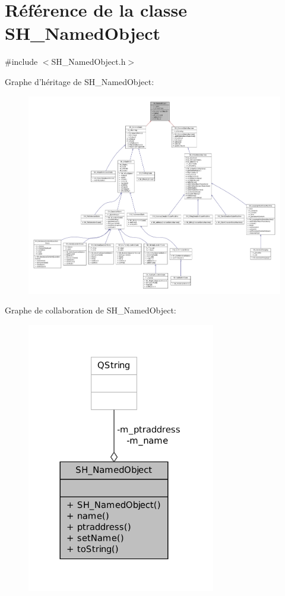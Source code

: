 \hypertarget{classSH__NamedObject}{\section{Référence de la classe S\-H\-\_\-\-Named\-Object}
\label{classSH__NamedObject}
}


{\ttfamily \#include $<$S\-H\-\_\-\-Named\-Object.\-h$>$}



Graphe d'héritage de S\-H\-\_\-\-Named\-Object\-:
\nopagebreak
\begin{figure}[H]
\begin{center}
\leavevmode
\includegraphics[width=350pt]{classSH__NamedObject__inherit__graph}
\end{center}
\end{figure}


Graphe de collaboration de S\-H\-\_\-\-Named\-Object\-:\nopagebreak
\begin{figure}[H]
\begin{center}
\leavevmode
\includegraphics[width=233pt]{classSH__NamedObject__coll__graph}
\end{center}
\end{figure}
